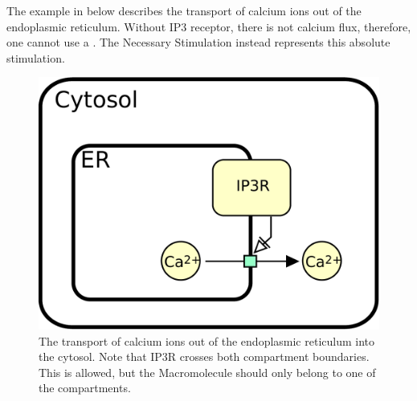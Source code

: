 The example in  below describes the transport of calcium ions out of the endoplasmic reticulum. Without IP3 receptor, there is not calcium flux, therefore, one cannot use a . The Necessary Stimulation instead represents this absolute stimulation.

\begin{figure}[H]
  \centering
  \includegraphics[scale = 0.5]{images/necessary_stim-transport}
  \caption{The transport of calcium ions out of the endoplasmic reticulum into the cytosol. Note that IP3R crosses both compartment boundaries. This is allowed, but the Macromolecule should only belong to one of the compartments.}
  \label{fig:necessary_stim-calcium}
\end{figure}
